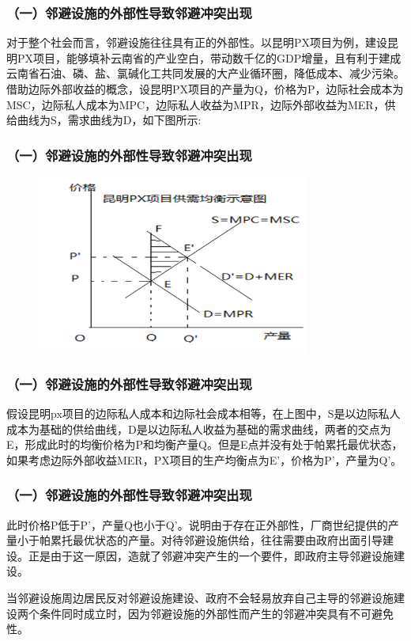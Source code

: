 \documentclass[aspectratio=169, 12pt]{beamer}
\begin{document}
\begin{frame}[plain]
    \frametitle{（一）邻避设施的外部性导致邻避冲突出现}
    对于整个社会而言，邻避设施往往具有正的外部性。以昆明PX项目为例，建设昆明PX项目，能够填补云南省的产业空白，带动数千亿的GDP增量，且有利于建成云南省石油、磷、盐、氯碱化工共同发展的大产业循环圈，降低成本、减少污染。借助边际外部收益的概念，设昆明PX项目的产量为Q，价格为P，边际社会成本为MSC，边际私人成本为MPC，边际私人收益为MPR，边际外部收益为MER，供给曲线为S，需求曲线为D，如下图所示:
\end{frame}

\begin{frame}[plain]
    \frametitle{（一）邻避设施的外部性导致邻避冲突出现}
    \begin{figure}
        \centering
        \includegraphics[width=0.8\textwidth]{./resources/figure/notinmybackyard.png}
        \end{figure}
\end{frame}

\begin{frame}[plain]
    \frametitle{（一）邻避设施的外部性导致邻避冲突出现}
    假设昆明px项目的边际私人成本和边际社会成本相等，在上图中，S是以边际私人成本为基础的供给曲线，D是以边际私人收益为基础的需求曲线，两者的交点为E，形成此时的均衡价格为P和均衡产量Q。但是E点并没有处于帕累托最优状态，如果考虑边际外部收益MER，PX项目的生产均衡点为E’，价格为P’，产量为Q’。
\end{frame}

\begin{frame}[plain]
    \frametitle{（一）邻避设施的外部性导致邻避冲突出现}
    此时价格P低于P’，产量Q也小于Q’。说明由于存在正外部性，厂商世纪提供的产量小于帕累托最优状态的产量。对待邻避设施供给，往往需要由政府出面引导建设。正是由于这一原因，造就了邻避冲突产生的一个要件，即政府主导邻避设施建设。
    \par
    当邻避设施周边居民反对邻避设施建设、政府不会轻易放弃自己主导的邻避设施建设两个条件同时成立时，因为邻避设施的外部性而产生的邻避冲突具有不可避免性。
\end{frame}
\end{document}
